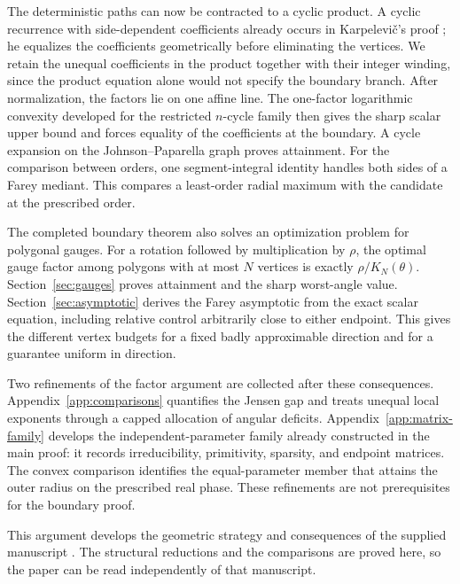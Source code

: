 \documentclass[11pt,a4paper]{article}
\theoremstyle{definition}
\theoremstyle{remark}
\numberwithin{equation}{section}
\begin{document}
The deterministic paths can now be contracted to a cyclic product. A cyclic recurrence with side-dependent coefficients already occurs in Karpelevi\v{c}'s proof \cite[Theorem~VI and equation~(13)]{Karp}; he equalizes the coefficients geometrically before eliminating the vertices. We retain the unequal coefficients in the product together with their integer winding, since the product equation alone would not specify the boundary branch. After normalization, the factors lie on one affine line. The one-factor logarithmic convexity developed for the restricted $n$-cycle family \cite[Lemmas~4.2 and~5.2]{VGNCycle} then gives the sharp scalar upper bound and forces equality of the coefficients at the boundary. A cycle expansion on the Johnson--Paparella graph proves attainment. For the comparison between orders, one segment-integral identity handles both sides of a Farey mediant. This compares a least-order radial maximum with the candidate at the prescribed order.

The completed boundary theorem also solves an optimization problem for
polygonal gauges. For a rotation followed by multiplication by $\rho$,
the optimal gauge factor among polygons with at most $N$ vertices
is exactly $\rho/K_N(\theta)$. Section~\ref{sec:gauges} proves attainment
and the sharp worst-angle value. Section~\ref{sec:asymptotic} derives
the Farey asymptotic from the exact scalar equation, including relative
control arbitrarily close to either endpoint. This gives the different
vertex budgets for a fixed badly approximable direction and for a
guarantee uniform in direction.

Two refinements of the factor argument are collected after these
consequences. Appendix~\ref{app:comparisons} quantifies the Jensen gap
and treats unequal local exponents through a capped allocation of
angular deficits. Appendix~\ref{app:matrix-family} develops the
independent-parameter family already constructed in the main proof:
it records irreducibility, primitivity, sparsity, and endpoint matrices.
The convex comparison identifies the equal-parameter member that
attains the outer radius on the prescribed real phase.
These refinements are not prerequisites for the boundary proof.

This argument develops the geometric strategy and consequences of the
supplied manuscript \cite{VG}. The structural reductions and the
comparisons are proved here, so the paper can be read independently of
that manuscript.

\end{document}
